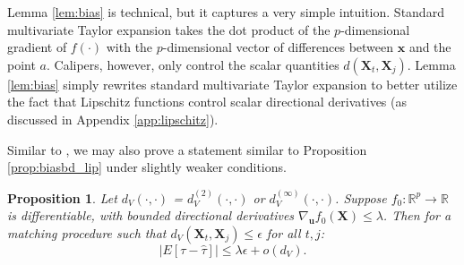 \documentclass{article}
\newtheorem{proposition}[theorem]{Proposition}
\newcommand{\Xt}{\mathbf{X}_t}
\newcommand{\Xj}{\mathbf{X}_j}
\newcommand{\R}{\mathbb{R}}
\newcommand{\Rp}{\mathbb{R}^p}
\begin{document}
Lemma \ref{lem:bias} is technical, but it captures a very simple intuition.
Standard multivariate Taylor expansion takes the dot product of the $p$-dimensional gradient of $f(\cdot)$ with the $p$-dimensional vector of differences between $\mathbf{x}$ and the point $a$.
Calipers, however, only control the scalar quantities $d(\Xt, \Xj)$.
Lemma \ref{lem:bias} simply rewrites standard multivariate Taylor expansion to better utilize the fact that Lipschitz functions control scalar directional derivatives (as discussed in Appendix \ref{app:lipschitz}).

Similar to \citet{iacus2011multivariate}, we may also prove a statement similar to Proposition \ref{prop:biasbd_lip} under slightly weaker conditions.
\begin{proposition}
Let $d_V(\cdot, \cdot)$ = $d^{(2)}_V(\cdot, \cdot)$ or $d^{(\infty)}_V(\cdot, \cdot)$.
Suppose $f_0: \Rp \to \R$ is differentiable, with bounded directional derivatives $\nabla_{\mathbf{u}} f_0(\mathbf{X}) \leq \lambda$.
Then for a matching procedure such that $d_V(\Xt, \Xj) \leq \epsilon$ for all $t,j$:
\begin{equation*}
\label{prop:biasbd_diff}
    \big|E[\tau - \hat{\tau}] \big| \leq \lambda \epsilon + o(d_V).
\end{equation*}
\end{proposition}
\end{document}
